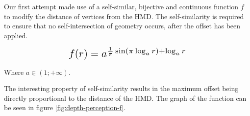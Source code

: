 Our first attempt made use of a self-similar, bijective and continuous function $f$ to modify the distance of vertices from the \ac{HMD}. The self-similarity is required to ensure that no self-intersection of geometry occurs, after the offset has been applied.

\begin{equation}
    \scalebox{1.5}{
        $f(r) = a^{\frac{1}{\pi}\sin(\pi \log_a{r}) + \log_a{r}}$
    }
    \label{eq:depth-perception-f}
\end{equation}

Where $a \in (1; +\infty)$.

The interesting property of self-similarity results in the maximum offset being directly proportional to the distance of the \ac{HMD}. The graph of the function can be seen in figure \ref{fig:depth-perception-f}.


